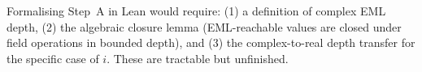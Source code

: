 \documentclass[11pt]{article}
\begin{document}
\medskip
\noindent
Formalising Step~A in Lean would require: (1) a definition of complex EML
depth, (2) the algebraic closure lemma (EML-reachable values are closed under
field operations in bounded depth), and (3) the complex-to-real depth transfer
for the specific case of $i$.  These are tractable but unfinished.
\end{document}
